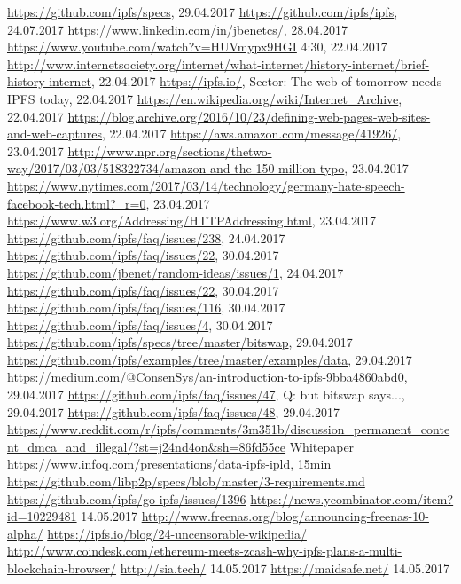 \documentclass[a4paper,11pt, oneside]{report}
\theoremstyle{definition}
\begin{document}
\begin{thebibliography}{1}
 \url{https://github.com/ipfs/specs}, 29.04.2017
 \url{https://github.com/ipfs/ipfs}, 24.07.2017
 \url{https://www.linkedin.com/in/jbenetcs/}, 28.04.2017
 \url{https://www.youtube.com/watch?v=HUVmypx9HGI} 4:30, 22.04.2017
 \url{http://www.internetsociety.org/internet/what-internet/history-internet/brief-history-internet}, 22.04.2017
 \url{https://ipfs.io/}, Sector: The web of tomorrow needs IPFS today, 22.04.2017
 \url{https://en.wikipedia.org/wiki/Internet_Archive}, 22.04.2017
 \url{https://blog.archive.org/2016/10/23/defining-web-pages-web-sites-and-web-captures}, 22.04.2017
 \url{https://aws.amazon.com/message/41926/}, 23.04.2017
 \url{http://www.npr.org/sections/thetwo-way/2017/03/03/518322734/amazon-and-the-150-million-typo}, 23.04.2017
 \url{https://www.nytimes.com/2017/03/14/technology/germany-hate-speech-facebook-tech.html?_r=0}, 23.04.2017
 \url{https://www.w3.org/Addressing/HTTPAddressing.html}, 23.04.2017 
\url{https://github.com/ipfs/faq/issues/238}, 24.04.2017
 \url{https://github.com/ipfs/faq/issues/22}, 30.04.2017
 \url{https://github.com/jbenet/random-ideas/issues/1}, 24.04.2017
 \url{https://github.com/ipfs/faq/issues/22}, 30.04.2017
 \url{https://github.com/ipfs/faq/issues/116}, 30.04.2017
 \url{https://github.com/ipfs/faq/issues/4}, 30.04.2017
 \url{https://github.com/ipfs/specs/tree/master/bitswap}, 29.04.2017
 \url{https://github.com/ipfs/examples/tree/master/examples/data}, 29.04.2017
 \url{https://medium.com/@ConsenSys/an-introduction-to-ipfs-9bba4860abd0}, 29.04.2017
 \url{https://github.com/ipfs/faq/issues/47}, Q: but bitswap says..., 29.04.2017
 \url{https://github.com/ipfs/faq/issues/48}, 29.04.2017
\url{https://www.reddit.com/r/ipfs/comments/3m351b/discussion_permanent_content_dmca_and_illegal/?st=j24nd4on&sh=86fd55ce}
 Whitepaper
 \url{https://www.infoq.com/presentations/data-ipfs-ipld}, 15min
 \url{https://github.com/libp2p/specs/blob/master/3-requirements.md} 
  \url{https://github.com/ipfs/go-ipfs/issues/1396}
 \url{https://news.ycombinator.com/item?id=10229481} 14.05.2017
 \url{}
 \url{http://www.freenas.org/blog/announcing-freenas-10-alpha/}
 \url{https://ipfs.io/blog/24-uncensorable-wikipedia/}
 \url{http://www.coindesk.com/ethereum-meets-zcash-why-ipfs-plans-a-multi-blockchain-browser/}
 \url{http://sia.tech/}  14.05.2017
 \url{https://maidsafe.net/} 14.05.2017
\end{thebibliography}


\printglossaries

\listoffigures
\end{document}

